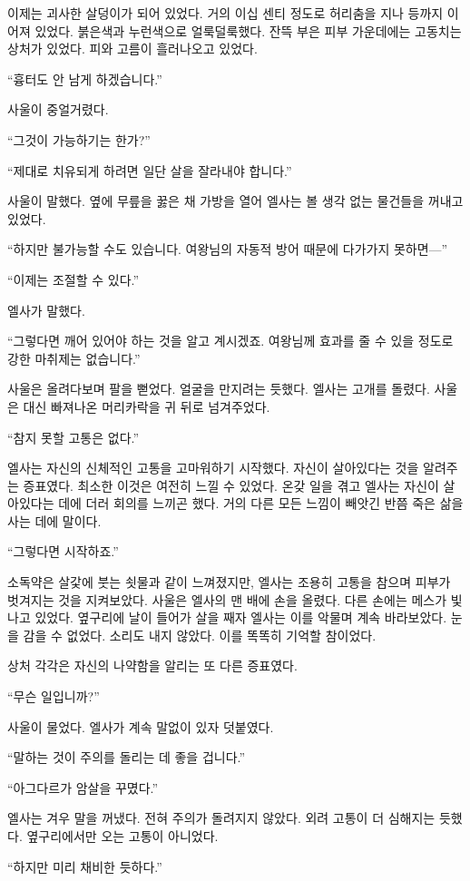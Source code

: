 이제는 괴사한 살덩이가 되어 있었다. 거의 이십 센티 정도로 허리춤을 지나 등까지 이어져 있었다. 붉은색과 누런색으로 얼룩덜룩했다. 잔뜩 부은 피부 가운데에는 고동치는 상처가 있었다. 피와 고름이 흘러나오고 있었다.

``흉터도 안 남게 하겠습니다.''

사울이 중얼거렸다.

``그것이 가능하기는 한가?''

``제대로 치유되게 하려면 일단 살을 잘라내야 합니다.''

사울이 말했다. 옆에 무릎을 꿇은 채 가방을 열어 엘사는 볼 생각 없는 물건들을 꺼내고 있었다.

``하지만 불가능할 수도 있습니다. 여왕님의 자동적 방어 때문에 다가가지 못하면—''

``이제는 조절할 수 있다.''

엘사가 말했다.

``그렇다면 깨어 있어야 하는 것을 알고 계시겠죠. 여왕님께 효과를 줄 수 있을 정도로 강한 마취제는 없습니다.''

사울은 올려다보며 팔을 뻗었다. 얼굴을 만지려는 듯했다. 엘사는 고개를 돌렸다. 사울은 대신 빠져나온 머리카락을 귀 뒤로 넘겨주었다.

``참지 못할 고통은 없다.''

엘사는 자신의 신체적인 고통을 고마워하기 시작했다. 자신이 살아있다는 것을 알려주는 증표였다. 최소한 이것은 여전히 느낄 수 있었다. 온갖 일을 겪고 엘사는 자신이 살아있다는 데에 더러 회의를 느끼곤 했다. 거의 다른 모든 느낌이 빼앗긴 반쯤 죽은 삶을 사는 데에 말이다.

``그렇다면 시작하죠.''

소독약은 살갗에 붓는 쇳물과 같이 느껴졌지만, 엘사는 조용히 고통을 참으며 피부가 벗겨지는 것을 지켜보았다. 사울은 엘사의 맨 배에 손을 올렸다. 다른 손에는 메스가 빛나고 있었다. 옆구리에 날이 들어가 살을 째자 엘사는 이를 악물며 계속 바라보았다. 눈을 감을 수 없었다. 소리도 내지 않았다. 이를 똑똑히 기억할 참이었다.

상처 각각은 자신의 나약함을 알리는 또 다른 증표였다.

``무슨 일입니까?''

사울이 물었다. 엘사가 계속 말없이 있자 덧붙였다.

``말하는 것이 주의를 돌리는 데 좋을 겁니다.''

``아그다르가 암살을 꾸몄다.''

엘사는 겨우 말을 꺼냈다. 전혀 주의가 돌려지지 않았다. 외려 고통이 더 심해지는 듯했다. 옆구리에서만 오는 고통이 아니었다.

``하지만 미리 채비한 듯하다.''

